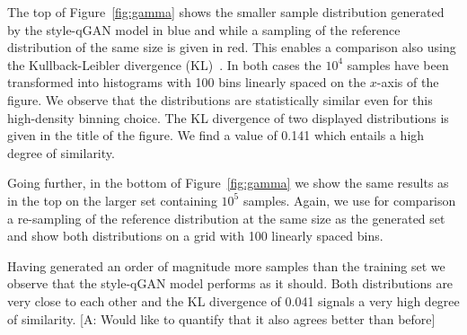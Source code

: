 \documentclass[twocolumn,preprintnumbers,superscriptaddress]{revtex4-2}
\newcommand{\commentAF}[1]{{\color{cyan} {[A: #1]}}}
\begin{document}
The top of Figure~\ref{fig:gamma} shows the smaller sample distribution generated by the style-qGAN model in blue and while a sampling of the reference distribution of the same size is given in red. This enables a comparison also using the Kullback-Leibler divergence (KL)~\cite{kullback1951information}.
In both cases the $10^4$ samples have been transformed into histograms with 100 bins linearly spaced on the $x$-axis of the figure. We observe that the distributions are statistically similar even for this high-density binning choice. The KL divergence of two displayed distributions is given in the title of the figure. We find a value of 0.141 which entails a high degree of similarity. 

Going further, in the bottom of Figure~\ref{fig:gamma} we show the same results as in the top on the larger set containing $10^5$ samples. Again, we use for comparison a re-sampling of the reference distribution at the same size as the generated set and show both distributions on a grid with 100 linearly spaced bins. 

Having generated an order of magnitude more samples than the training set we observe that the style-qGAN model performs as it should. Both distributions are very close to each other and the KL divergence of 0.041 signals a very high degree of similarity. \commentAF{Would like to quantify that it also agrees better than before}
\end{document}
